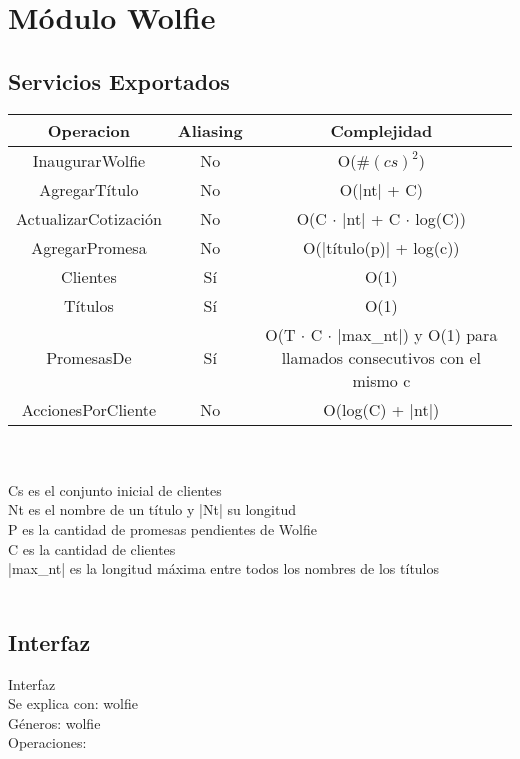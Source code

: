 \section{M\'odulo Wolfie}

\subsection{Servicios Exportados}
	
\begin{tabular}[c]{|c|c|c|}
	
		\hline
		Operacion & Aliasing & Complejidad \\
		\hline
		InaugurarWolfie  & No & O(\#$(cs)^2$) \\
		\hline
		AgregarT\'itulo & No & O(|nt| + C) \\
		\hline
		ActualizarCotizaci\'on & No & O(C $\cdot$ |nt| + C $\cdot$ log(C)) \\
		\hline
		AgregarPromesa & No & O(|t\'itulo(p)| + log(c))\\
		\hline
		Clientes & S\'i & O(1) \\
		\hline
		T\'itulos & S\' i & O(1)\\
		\hline
		PromesasDe & S\' i & O(T $\cdot$ C $\cdot$ |max\_nt|) y O(1) para llamados consecutivos con el mismo c \\
		\hline
		AccionesPorCliente & No  & O(log(C) + |nt|)\\
		\hline
		\end{tabular}\\\\

Cs es el conjunto inicial de clientes\\
Nt es el nombre de un t\'itulo y |Nt| su longitud\\
P es la cantidad de promesas pendientes de Wolfie\\
C es la cantidad de clientes\\
|max\_nt| es la longitud m\'axima entre todos los nombres de los t\'itulos\\\\


\subsection{Interfaz}
	Interfaz \\
	Se explica con: wolfie\\
	G\'{e}neros: wolfie\\
	Operaciones:\\


